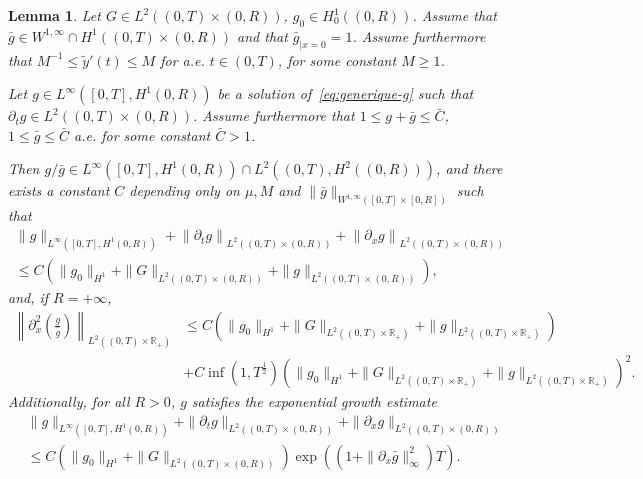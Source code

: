 \documentclass[10pt]{amsart}
\newtheorem{lemm}[theo]{Lemma}\newtheorem{prop}[theo]{Proposition}\newtheorem{coro}[theo]{Corollary}\newtheorem{conj}[theo]{Conjecture}
\theoremstyle{definition}\newtheorem{defi}[theo]{Definition}\newtheorem{rema}[theo]{Remark}\newtheorem{exam}[theo]{Example}\newtheorem{exem}[theo]{Example}\newtheorem{nota}[theo]{Notation}
\newcommand{\R}{\mathbb{R}}
\newcommand{\p}{\partial}
\newcommand{\ty}{\widetilde{y}}
\begin{document}
\begin{lemm}\label{lem:generique-g}
Let $G\in L^2((0,T)\times (0,R))$, $g_0\in H^1_0((0,R))$. Assume that $\bar g \in W^{1,\infty}\cap H^1((0,T)\times (0,R))$ and that $\bar g_{|x=0}=1$. Assume furthermore that $M^{-1}\leq \ty'(t)\leq M$ for a.e. $t\in (0,T)$, for some constant $M\geq 1$.

Let $g\in L^\infty([0,T], H^1(0,R))$ be a solution of~\eqref{eq:generique-g} such that $\p_t g\in L^2((0,T)\times (0,R))$. Assume furthermore that $1\leq g + \bar g \leq \bar C$, $1\leq \bar g \leq \bar C$ a.e. for some constant $\bar C>1$.

Then $g/\bar g\in L^\infty([0,T], H^1(0,R))\cap L^2((0,T), H^2((0,R)))$, and there exists a constant $C$ depending only on $\mu, M$ and $\|\bar g\|_{W^{1,\infty}([0,T]\times [0,R])}$ such that
\begin{multline*}
\|g\|_{L^\infty\left([0,T], H^1(0,R)\right)} + \left\| \p_t g\right\|_{ L^2\left((0,T)\times (0,R)\right)} + \left\|\p_x g \right\|_{ L^2\left((0,T)\times (0,R)\right)} \\
\leq C \left(\|g_0\|_{H^1} + \| G\|_{L^2\left((0,T)\times (0,R)\right)} +\|g\|_{L^2\left((0,T)\times (0,R)\right)}\right),
\end{multline*}
and, if $R=+\infty$,
\begin{align*}
\left\| \p_x^2 \left(\frac{g}{\bar g}\right)\right\|_{L^2\left((0,T)\times \R_+\right)}
&\leq C \left(\|g_0\|_{H^1} + \| G\|_{L^2\left((0,T)\times \R_+\right)} +\|g\|_{L^2\left((0,T)\times \R_+\right)}\right)\\
&+ C \inf\left(1, T^{\frac{1}{2}}\right)\left(\|g_0\|_{H^1} + \| G\|_{L^2\left((0,T)\times \R_+\right)} +\|g\|_{L^2\left((0,T)\times \R_+\right)}\right)^2.
\end{align*}
Additionally, for all $R>0$, $g$ satisfies the exponential growth estimate
\begin{align*}
&\|g\|_{L^\infty([0,T], H^1(0,R))} + \| \p_t g\|_{ L^2((0,T)\times (0,R))} + \|\p_x g \|_{ L^2((0,T)\times (0,R))}\\
&\leq C \left(\|g_0\|_{H^1} + \| G\|_{L^2((0,T)\times (0,R))}\right) \exp((1+ \|\p_x \bar g\|_\infty^2) T).
\end{align*}
\end{lemm}
\end{document}
